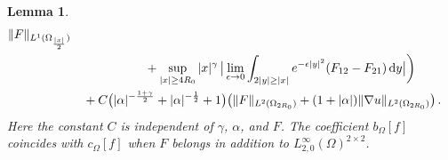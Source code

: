 \documentclass[11pt,a4paper]{article}
\newtheorem{lemma}[theorem]{Lemma}
\newcommand{\dd}{\,{\rm d}}
\begin{document}
\begin{lemma}
\begin{align}
\begin{split}
\| F \|_{L^1 (\Omega_{ \frac{|x|}{2} })}  \\
& \qquad \qquad  \qquad 
+ \sup_{|x|\geq 4 R_0} |x|^\gamma \, \big | \lim_{\epsilon \rightarrow 0}  \int_{2 |y|\geq |x|} e^{-\epsilon |y|^2} (F_{12}-F_{21} ) \dd y \big | \bigg ) \\
& \quad  + C \big ( |\alpha|^{-\frac{1+\gamma}{2}} 
+ |\alpha|^{-\frac12} + 1 \big ) \big ( \| F\|_{L^2 (\Omega_{2 R_0})} + (1+|\alpha|) \| \nabla u \|_{L^2 (\Omega_{2 R_0})} \big )\,.  \label{est.lem.linear.exterior.2}
\end{split}
\end{align}
%
Here the constant $C$ is independent of $\gamma$, $\alpha$, and $F$. 
The coefficient $b_\Omega [f]$ coincides with $c_\Omega [f]$ when $F$ belongs in addition to $L^\infty_{2,0} (\Omega)^{2\times 2}$.
\end{lemma}
%
\end{document}
